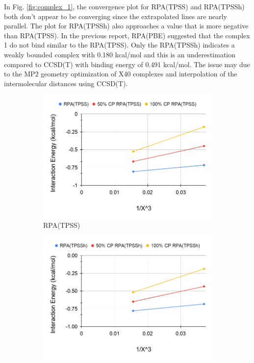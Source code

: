 \documentclass[11pt]{article}
\begin{document}
In Fig. \ref{fig:complex_1}, the convergence plot for RPA(TPSS) and
RPA(TPSSh) both don't appear to be converging since the extrapolated
lines are nearly parallel. The plot for RPA(TPSSh) also approaches a
value that is more negative than RPA(TPSS). In the previous report,
RPA(PBE) suggested that the complex 1 do not bind similar to the
RPA(TPSS). Only the RPA(TPSSh) indicates a weakly bounded complex
with 0.180 kcal/mol and this is an underestimation compared to
CCSD(T) with binding energy of 0.491 kcal/mol. The issue may due to
the MP2 geometry optimization of X40 complexes and interpolation of
the intermolecular distances using CCSD(T).

\begin{figure}[hbpt]
  \centering
  \begin{subfigure}{.5\textwidth}
    \centering
    \includegraphics[scale=0.3]{tpss-8.png}
    \caption{RPA(TPSS)}
    \label{fig:tpss_8}
  \end{subfigure}%
  \begin{subfigure}{.5\textwidth}
    \centering
    \includegraphics[scale=0.3]{tpssh-8.png}

\end{subfigure}
\end{figure}
\end{document}
